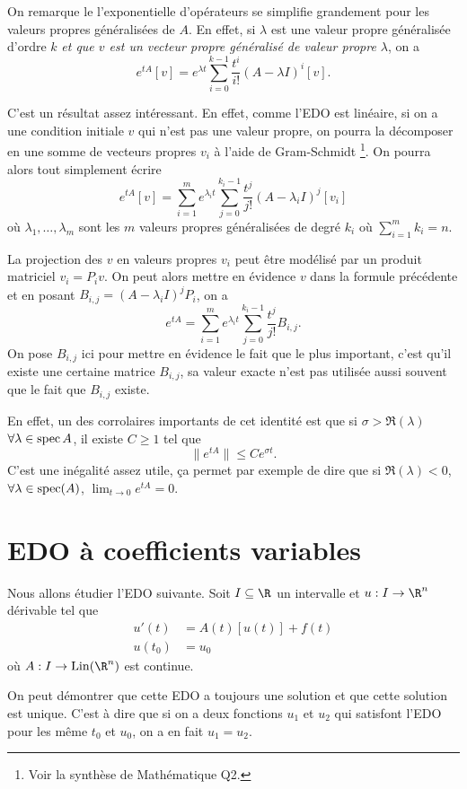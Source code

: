 On remarque le l'exponentielle d'opérateurs se simplifie grandement
pour les valeurs propres généralisées de $A$.
En effet, si $\lambda$ est une valeur propre généralisée d'ordre $k$
\emph{et que $v$ est un vecteur propre généralisé de valeur propre $\lambda$},
on a
\[ e^{tA}[v] =
e^{\lambda t} \sum_{i=0}^{k-1}\frac{t^i}{i!}(A-\lambda I)^i[v]. \]

C'est un résultat assez intéressant.
En effet, comme l'EDO est linéaire, si on a une condition initiale
$v$ qui n'est pas une valeur propre, on pourra la décomposer en une somme
de vecteurs propres $v_i$ à l'aide de Gram-Schmidt
\footnote{Voir la synthèse de Mathématique Q2.}. %
On pourra alors tout simplement écrire
\[ e^{tA}[v] =
\sum_{i=1}^m e^{\lambda_i t}
\sum_{j=0}^{k_i-1}\frac{t^j}{j!}(A-\lambda_i I)^j[v_i] \]
où $\lambda_1, \ldots, \lambda_m$ sont les $m$ valeurs propres généralisées
de degré $k_i$ où $\sum_{i=1}^m k_i = n$.

La projection des $v$ en valeurs propres $v_i$ peut être modélisé
par un produit matriciel $v_i = P_i v$.
On peut alors mettre en évidence $v$ dans la formule précédente et en posant
$B_{i,j} = (A-\lambda_i I)^j P_i$, on a
\[ e^{tA} =
\sum_{i=1}^m e^{\lambda_i t}
\sum_{j=0}^{k_i-1}\frac{t^j}{j!}B_{i,j}. \]
On pose $B_{i,j}$ ici pour mettre en évidence le fait que le plus important,
c'est qu'il existe une certaine matrice $B_{i,j}$,
sa valeur exacte n'est pas utilisée aussi souvent que le fait que $B_{i,j}$
existe.

En effet, un des corrolaires importants de cet identité est que
si $\sigma > \Re(\lambda)$ $\forall \lambda \in \operatorname{spec} A$,
il existe $C \geq 1$ tel que
\[ \|e^{tA}\| \leq Ce^{\sigma t}. \]
C'est une inégalité assez utile,
ça permet par exemple de dire que si
$\Re(\lambda) < 0$, $\forall \lambda \in \operatorname{spec}(A)$,
$\lim_{t\to 0} e^{tA} = 0$.

\section{EDO à coefficients variables}
Nous allons étudier l'EDO suivante.
Soit $I \subseteq \R$ un intervalle et $u:I\to\R^n$ dérivable tel que
\begin{align*}
  u'(t) & = A(t)[u(t)] + f(t)\\
  u(t_0) & = u_0
\end{align*}
où $A : I \to \lin(\R^n)$ est continue.

On peut démontrer que cette EDO a toujours une solution et que cette
solution est unique.
C'est à dire que si on a deux fonctions $u_1$ et $u_2$ qui satisfont
l'EDO pour les même $t_0$ et $u_0$, on a en fait $u_1 = u_2$.


